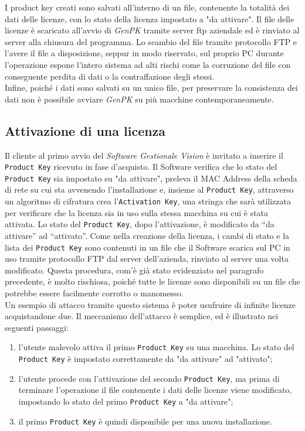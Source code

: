 I product key creati sono salvati all'interno di un file, contenente la totalità dei dati delle licenze, con lo stato della licenza impostato a "da attivare". Il file delle licenze è scaricato all'avvio di \textit{GenPK} tramite server \gls{ftp} aziendale ed è rinviato al server alla chiusura del programma. Lo scambio del file tramite protocollo FTP e l'avere il file a disposizione, seppur in modo riservato, sul proprio PC durante l'operazione espone l'intero sistema ad alti rischi come la corruzione del file con conseguente perdita di dati o la contraffazione degli stessi.\\
Infine, poiché i dati sono salvati su un unico file, per preservare la consistenza dei dati non è possibile avviare \textit{GenPK} su più macchine contemporaneamente.

\subsection{Attivazione di una licenza} 
Il cliente al primo avvio del \textit{Software Gestionale Vision} è invitato a inserire il \texttt{Product Key} ricevuto in fase d'acquisto. Il Software verifica che lo stato del \texttt{Product Key} sia impostato su "da attivare", preleva il \gls{MAC Address} della scheda di rete su cui sta avvenendo l'installazione e, insieme al \texttt{Product Key}, attraverso un algoritmo di cifratura crea l’\texttt{Activation Key}, una stringa che sarà utilizzata per verificare che la licenza sia in uso sulla stessa macchina su cui è stata attivata. Lo stato del \texttt{Product Key}, dopo l'attivazione, è modificato da “da attivare” ad “attivato”. Come nella creazione della licenza, i cambi di stato e la lista dei \texttt{Product Key} sono contenuti in un file che il Software scarica sul PC in uso tramite protocollo FTP dal server dell’azienda, rinviato al server una volta modificato. Questa procedura, com'è già stato evidenziato nel paragrafo precedente, è molto rischiosa, poiché tutte le licenze sono disponibili su un file che potrebbe essere facilmente corrotto o manomesso.\\
Un esempio di attacco tramite questo sistema è poter usufruire di infinite licenze acquistandone due. 
Il meccanismo dell'attacco è semplice, ed è illustrato nei seguenti passaggi:
\begin{enumerate}
\item l'utente malevolo attiva il primo \texttt{Product Key} su una macchina. Lo stato del \texttt{Product Key} è impostato correttamente da "da attivare" ad "attivato"; 
\item l'utente procede con l'attivazione del secondo \texttt{Product Key}, ma prima di terminare l'operazione il file contenente i dati delle licenze viene modificato, impostando lo stato del primo \texttt{Product Key} a "da attivare";
\item il primo \texttt{Product Key} è quindi disponibile per una nuova installazione.
\end{enumerate}
